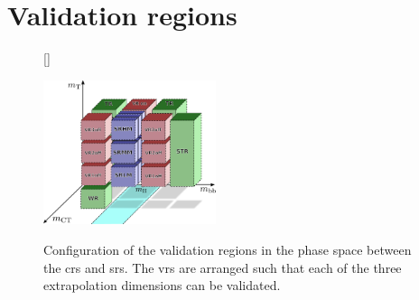 \section{Validation regions}



\begin{figure}
[\FBwidth]
{\caption{Configuration of the validation regions in the phase space between the \glspl{cr} and \glspl{sr}. The \glspl{vr} are arranged such that each of the three extrapolation dimensions can be validated.}\label{fig:vr_strategy}}
{\includegraphics[width=0.45\textwidth]{strategy_7}}
\end{figure}
